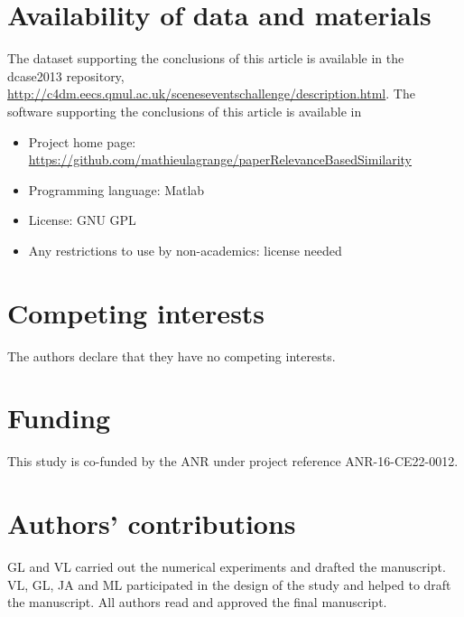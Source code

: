 \documentclass[smallextended]{svjour3}
\begin{document}
\section*{Availability of data and materials}
The dataset supporting the conclusions of this article is available in the dcase2013 repository,  \sloppy \url{http://c4dm.eecs.qmul.ac.uk/sceneseventschallenge/description.html}.
The software supporting the conclusions of this article is available in
\begin{itemize}
\item \sloppy Project home page: \url{https://github.com/mathieulagrange/paperRelevanceBasedSimilarity}
\item Programming language: Matlab
\item License: GNU GPL
\item Any restrictions to use by non-academics: license needed
\end{itemize}


\section*{Competing interests}
The authors declare that they have no competing interests.

\section*{Funding}
This study is co-funded by the ANR under project reference ANR-16-CE22-0012.

\section*{Authors' contributions}
GL and VL carried out the numerical experiments and drafted the manuscript. VL, GL, JA and ML participated in the design of the study and helped to draft the manuscript.
All authors read and approved the final manuscript.


%
%
\printbibliography
\end{document}
